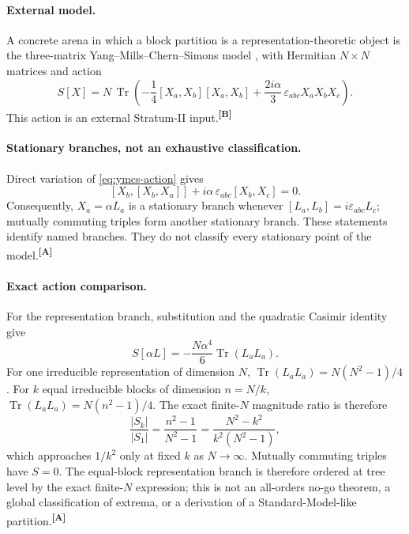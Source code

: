 \documentclass[12pt,a4paper,twoside]{article}
\theoremstyle{plain}
\theoremstyle{definition}
\theoremstyle{remark}
\newcommand{\catmark}[1]{\textsuperscript{\textsf{\textbf{[#1]}}}}
\begin{document}
\paragraph{External model.}
A concrete arena in which a block partition is a representation-theoretic
object is the three-matrix Yang--Mills--Chern--Simons model
\cite{azuma2004}, with Hermitian $N\times N$ matrices and action
\begin{equation}
\label{eq:ymcs-action}
S[X]=N\,\operatorname{Tr}\!\left(
-\frac14[X_a,X_b][X_a,X_b]
+\frac{2i\alpha}{3}\,\varepsilon_{abc}X_aX_bX_c
\right).
\end{equation}
This action is an external Stratum-II input.\catmark{B}

\paragraph{Stationary branches, not an exhaustive classification.}
Direct variation of \cref{eq:ymcs-action} gives
\begin{equation}
\label{eq:ymcs-eom}
[X_b,[X_b,X_a]]+i\alpha\,\varepsilon_{abc}[X_b,X_c]=0.
\end{equation}
Consequently, $X_a=\alpha L_a$ is a stationary branch whenever
$[L_a,L_b]=i\varepsilon_{abc}L_c$; mutually commuting triples form
another stationary branch. These statements identify named branches.
They do not classify every stationary point of the model.\catmark{A}

\paragraph{Exact action comparison.}
For the representation branch, substitution and the quadratic Casimir
identity give
\begin{equation}
\label{eq:ymcs-classical-value}
S[\alpha L]= -\frac{N\alpha^4}{6}\operatorname{Tr}(L_aL_a).
\end{equation}
For one irreducible representation of dimension $N$,
\(
\operatorname{Tr}(L_aL_a)=N(N^2-1)/4
\).
For $k$ equal irreducible blocks of dimension $n=N/k$,
\(
\operatorname{Tr}(L_aL_a)=N(n^2-1)/4
\).
The exact finite-$N$ magnitude ratio is therefore
\begin{equation}
\label{eq:ymcs-equal-block-ratio}
\frac{|S_k|}{|S_1|}
=\frac{n^2-1}{N^2-1}
=\frac{N^2-k^2}{k^2(N^2-1)},
\end{equation}
which approaches $1/k^2$ only at fixed $k$ as $N\to\infty$. Mutually
commuting triples have $S=0$. The equal-block representation branch is
therefore ordered at tree level by the exact finite-$N$ expression; this
is not an all-orders no-go theorem, a global classification of extrema,
or a derivation of a Standard-Model-like partition.\catmark{A}
\end{document}
